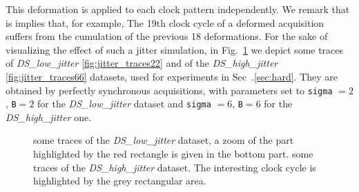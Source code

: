 This deformation is applied to each clock pattern independently. We remark that is implies that, for example, The 19th clock cycle of a deformed acquisition suffers from the cumulation of the previous 18 deformations. For the sake of visualizing the effect of such a jitter simulation, in Fig.~\ref{fig:jitter_traces} we depict some traces of  \emph{DS\_low\_jitter} \ref{fig:jitter_traces22} and of the \emph{DS\_high\_jitter} \ref{fig:jitter_traces66} datasets, used for experiments in Sec~.\ref{sec:hard}. They are obtained by perfectly synchronous acquisitions, with parameters set to \texttt{sigma} $= 2$, \texttt{B}$= 2$ for the \emph{DS\_low\_jitter}  dataset and \texttt{sigma} $= 6$, \texttt{B}$= 6$ for the \emph{DS\_high\_jitter} one.


\begin{figure}
\centering
{}
\caption[Hardware misalignment: \emph{DS\_low\_jitter} and \emph{DS\_high\_jitter} datasets.]{  some traces of the \emph{DS\_low\_jitter} dataset, a zoom of the part highlighted by the red rectangle is given in the bottom part.  some traces of the \emph{DS\_high\_jitter} dataset. The interesting clock cycle is highlighted by the grey rectangular area.}\label{fig:jitter_traces}
\end{figure}

